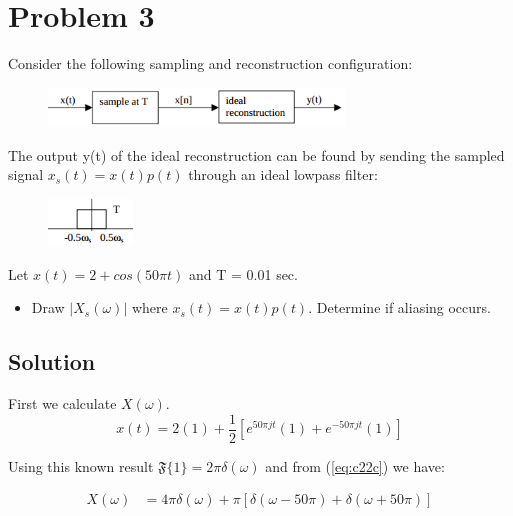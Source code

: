 \section*{Problem 3}

Consider the following sampling and reconstruction configuration:

\begin{figure}[H]
\caption*{}
\centering
\includegraphics[width=0.7\textwidth]{figs/c3p31.png}
\label{fig:c3p31}
\end{figure} 

The output y(t) of the ideal reconstruction can be found by sending the sampled signal 
$x_s(t) = x(t)p(t)$ through an ideal lowpass filter:

\begin{figure}[H]
\caption*{}
\centering
\includegraphics[width=0.2\textwidth]{figs/c3p32.png}
\label{fig:c3p32}
\end{figure} 

Let $x(t) = 2 + cos(50\pi t)$ and T = 0.01 sec.

\begin{itemize}
\item  Draw $|X_s(\omega)|$ where $x_s(t) = x(t)p(t)$. Determine if aliasing occurs.
\end{itemize} 

\subsection*{Solution}

First we calculate $X(\omega)$.
\begin{equation*}
x(t) = 2 (1) + \frac{1}{2} \left[
	e^{50 \pi jt} (1) + e^{- 50 \pi jt} (1) \right]
\end{equation*} 

Using this known result $\mathfrak{F}\{1\} = 2 \pi \delta(\omega)$ 
and from (\ref{eq:c22c}) we have:

\begin{equation*}
\begin{aligned}
X(\omega) &= 4 \pi \delta(\omega) + 
	\pi \left[\delta(\omega - 50\pi) + \delta(\omega + 50 \pi)\right] 
\end{aligned}
\end{equation*} 

